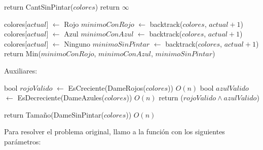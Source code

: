 \begin{algorithm}[H]
\begin{algorithmic}


    \State return CantSinPintar($colores$)
  \Else
    \State return $\infty$
  \EndIf

\Else

  \State colores[$actual$] $\gets$ Rojo
  \State $minimoConRojo$ $\gets$ backtrack($colores$, $actual + 1$) \\

  \State colores[$actual$] $\gets$ Azul
  \State $minimoConAzul$ $\gets$ backtrack($colores$, $actual + 1$) \\

  \State colores[$actual$] $\gets$ Ninguno
  \State $minimoSinPintar$ $\gets$ backtrack($colores$, $actual + 1$) \\

  \State return Min($minimoConRojo$, $minimoConAzul$, $minimoSinPintar$)

\EndIf
\EndProcedure
\end{algorithmic}
\end{algorithm}


Auxiliares:

\begin{algorithm}[H]
\begin{algorithmic}

    \State bool $rojoValido$ $\gets$ EsCreciente(DameRojos($colores$))  \Comment $O(n)$
    \State bool $azulValido$ $\gets$ EsDecreciente(DameAzules($colores$)) \Comment $O(n)$
    \State return ($rojoValido \land azulValido$)

\EndProcedure
\end{algorithmic}
\end{algorithm}


\begin{algorithm}[H]
\begin{algorithmic}
    \State return Tamaño(DameSinPintar($colores$))  \Comment $O(n)$
\EndProcedure
\end{algorithmic}
\end{algorithm}


Para resolver el problema original, llamo a la función con los siguientes parámetros:

